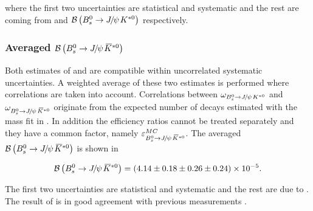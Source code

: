  \noindent where the first two uncertainties are statistical and systematic and the rest are coming from \fdfs and $\BRof\BdJpsiKst$ respectively.

\subsubsection{Averaged $\BRof\BsJpsiKst$}
Both estimates of  and  are compatible within uncorrelated systematic uncertainties. A weighted average of these two
estimates is performed where correlations are taken into account. Correlations between $\omega_{\BdJpsiKst}$ and $\omega_{\BsJpsiKst}$ originate from the
expected number of decays estimated with the mass fit in . In addition the efficiency ratios cannot be treated separately
and they have a common factor, namely $\varepsilon_{\BsJpsiKst}^{MC}$. The averaged  $\BRof\BsJpsiKst$ is shown in 

\begin{equation}
  \centering
\BRof\BsJpsiKst = (4.14 \pm 0.18 \pm 0.26 \pm 0.24 )\times 10^{-5}.
\label{Br_total}
\end{equation}

\noindent The first two uncertainties are statistical and systematic and the rest are due to \fdfs.
The result of  is in good agreement with previous measurements \cite{Aaij:2012nh}.
